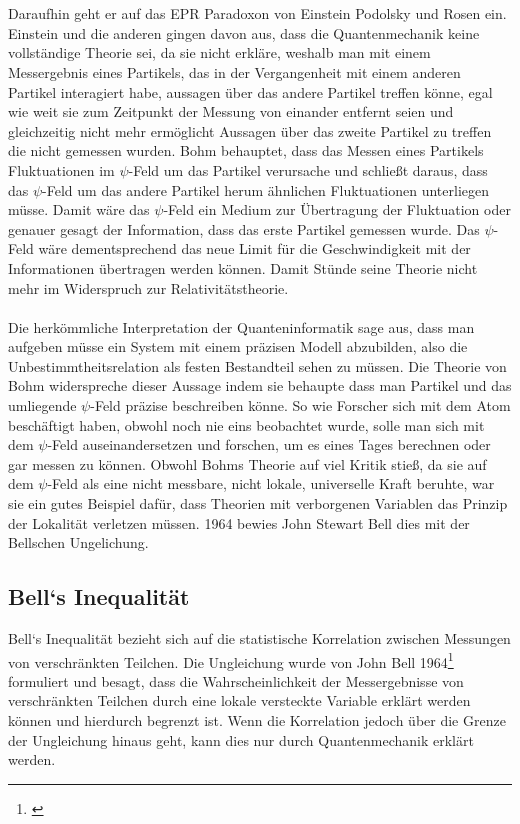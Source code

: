 \\\\
Daraufhin geht er auf das EPR Paradoxon von Einstein Podolsky und Rosen ein. Einstein und die anderen gingen davon aus, dass die Quantenmechanik keine vollständige Theorie sei, da sie nicht erkläre, weshalb man mit einem Messergebnis eines Partikels, das in der Vergangenheit mit einem anderen Partikel interagiert habe, aussagen über das andere Partikel treffen könne, egal wie weit sie zum Zeitpunkt der Messung von einander entfernt seien und gleichzeitig nicht mehr ermöglicht Aussagen über das zweite Partikel zu treffen die nicht gemessen wurden. Bohm behauptet, dass das Messen eines Partikels Fluktuationen im $\psi$-Feld um das Partikel verursache und schließt daraus, dass das $\psi$-Feld um das andere Partikel herum ähnlichen Fluktuationen unterliegen müsse. Damit wäre das $\psi$-Feld ein Medium zur Übertragung der Fluktuation oder genauer gesagt der Information, dass das erste Partikel gemessen wurde. Das $\psi$-Feld wäre dementsprechend das neue Limit für die Geschwindigkeit mit der Informationen übertragen werden können. Damit Stünde seine Theorie nicht mehr im Widerspruch zur Relativitätstheorie.\\\\
Die herkömmliche Interpretation der Quanteninformatik sage aus, dass man aufgeben müsse ein System mit einem präzisen Modell abzubilden, also die Unbestimmtheitsrelation als festen Bestandteil sehen zu müssen. Die Theorie von Bohm widerspreche dieser Aussage indem sie behaupte dass man Partikel und das umliegende $\psi$-Feld präzise beschreiben könne. So wie Forscher sich mit dem Atom beschäftigt haben, obwohl noch nie eins beobachtet wurde, solle man sich mit dem $\psi$-Feld auseinandersetzen und forschen, um es eines Tages berechnen oder gar messen zu können.
Obwohl Bohms Theorie auf viel Kritik stieß, da sie auf dem $\psi$-Feld als eine nicht messbare, nicht lokale, universelle Kraft beruhte, war sie ein gutes Beispiel dafür, dass Theorien mit verborgenen Variablen das Prinzip der Lokalität verletzen müssen. 1964 bewies John Stewart Bell dies mit der Bellschen Ungelichung.


\subsection{Bell`s Inequalität}
\label{subsec:bells_inequality}
Bell`s Inequalität bezieht sich auf die statistische Korrelation zwischen Messungen von verschränkten Teilchen.
Die Ungleichung wurde von John Bell 1964\footnote{\cite{bell_einstein_1964}} formuliert und besagt, dass die Wahrscheinlichkeit der Messergebnisse von verschränkten Teilchen durch eine lokale versteckte Variable erklärt werden können und hierdurch begrenzt ist.
Wenn die Korrelation jedoch über die Grenze der Ungleichung hinaus geht, kann dies nur durch Quantenmechanik erklärt werden.\\

